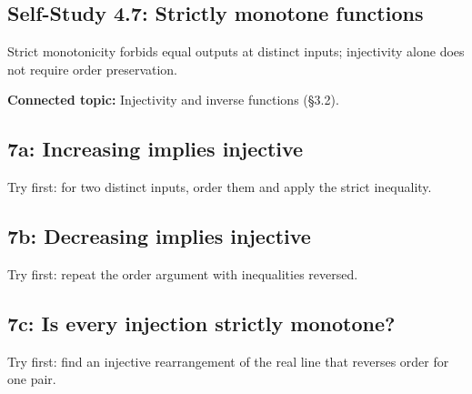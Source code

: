 \documentclass[11pt]{article}
\begin{document}
\begin{keepsection}
\section{Self-Study 4.7: Strictly monotone functions}

Strict monotonicity forbids equal outputs at distinct inputs; injectivity alone does not require order preservation.

\textbf{Connected topic:} Injectivity and inverse functions (§3.2).

\begin{keepsection}
\subsection{7a: Increasing implies injective}

Try first: for two distinct inputs, order them and apply the strict inequality.

\end{keepsection}

\begin{keepsection}
\subsection{7b: Decreasing implies injective}

Try first: repeat the order argument with inequalities reversed.

\end{keepsection}

\begin{keepsection}
\subsection{7c: Is every injection strictly monotone?}

Try first: find an injective rearrangement of the real line that reverses order for one pair.

\end{keepsection}


\end{keepsection}
\end{document}
